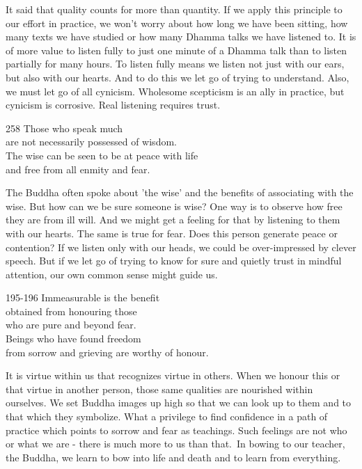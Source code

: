 \begin{dhpRefl}
It said that quality counts for more than quantity. If we apply this principle to our effort in practice, we won't worry about how long we have been sitting, how many texts we have studied or how many Dhamma talks we have listened to. It is of more value to listen fully to just one minute of a Dhamma talk than to listen partially for many hours. To listen fully means we listen not just with our ears, but also with our hearts. And to do this we let go of trying to understand. Also, we must let go of all cynicism. Wholesome scepticism is an ally in practice, but cynicism is corrosive. Real listening requires trust.
\end{dhpRefl}


\begin{dhpVerse}{258}
\label{dhp-258}
Those who speak much\\
are not necessarily possessed of wisdom.\\
The wise can be seen to be at peace with life\\
and free from all enmity and fear.
\end{dhpVerse}

\begin{dhpRefl}
The Buddha often spoke about 'the wise' and the benefits of associating with the wise. But how can we be sure someone is wise? One way is to observe how free they are from ill will. And we might get a feeling for that by listening to them with our hearts. The same is true for fear. Does this person generate peace or contention? If we listen only with our heads, we could be over-impressed by clever speech. But if we let go of trying to know for sure and quietly trust in mindful attention, our own common sense might guide us.
\end{dhpRefl}


\begin{dhpVerse}{195-196}
\label{dhp-195}\label{dhp-196}
Immeasurable is the benefit\\
obtained from honouring those\\
who are pure and beyond fear.\\
Beings who have found freedom\\
from sorrow and grieving are worthy of honour.
\end{dhpVerse}

\begin{dhpRefl}
It is virtue within us that recognizes virtue in others. When we honour this or that virtue in another person, those same qualities are nourished within ourselves. We set Buddha images up high so that we can look up to them and to that which they symbolize. What a privilege to find confidence in a path of practice which points to sorrow and fear as teachings. Such feelings are not who or what we are - there is much more to us than that. In bowing to our teacher, the Buddha, we learn to bow into life and death and to learn from everything.
\end{dhpRefl}

